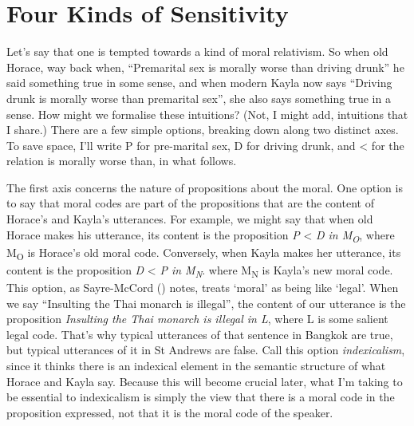 \documentclass[
  11pt,
  letterpaper,
  DIV=11,
  numbers=noendperiod,
  oneside]{scrartcl}
\begin{document}
\section{Four Kinds of Sensitivity}\label{four-kinds-of-sensitivity}

Let's say that one is tempted towards a kind of moral relativism. So
when old Horace, way back when, ``Premarital sex is morally worse than
driving drunk'' he said something true in some sense, and when modern
Kayla now says ``Driving drunk is morally worse than premarital sex'',
she also says something true in a sense. How might we formalise these
intuitions? (Not, I might add, intuitions that I share.) There are a few
simple options, breaking down along two distinct axes. To save space,
I'll write P for pre-marital sex, D for driving drunk, and \textless{}
for the relation is morally worse than, in what follows.

The first axis concerns the nature of propositions about the moral. One
option is to say that moral codes are part of the propositions that are
the content of Horace's and Kayla's utterances. For example, we might
say that when old Horace makes his utterance, its content is the
proposition \emph{P} \textless{} \emph{D in M\textsubscript{O}}, where
M\textsubscript{O} is Horace's old moral code. Conversely, when Kayla
makes her utterance, its content is the proposition \emph{D} \textless{}
\emph{P in M\textsubscript{N}}. where M\textsubscript{N} is Kayla's new
moral code. This option, as Sayre-McCord
() notes, treats `moral' as being
like `legal'. When we say ``Insulting the Thai monarch is illegal'', the
content of our utterance is the proposition \emph{Insulting the Thai
monarch is illegal in L}, where L is some salient legal code. That's why
typical utterances of that sentence in Bangkok are true, but typical
utterances of it in St Andrews are false. Call this option
\emph{indexicalism}, since it thinks there is an indexical element in
the semantic structure of what Horace and Kayla say. Because this will
become crucial later, what I'm taking to be essential to indexicalism is
simply the view that there is a moral code in the proposition expressed,
not that it is the moral code of the speaker.
\end{document}
